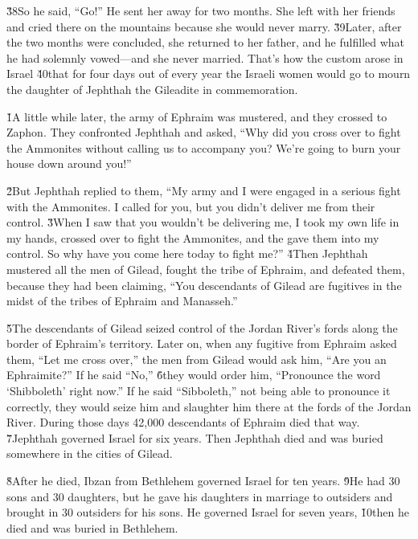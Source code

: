 \v{38}So he said, ``Go!'' He sent her away for two months. She left with her friends and cried there on the mountains because she would never marry. \v{39}Later, after the two months were concluded, she returned to her father, and he fulfilled what he had solemnly vowed---and she never married. That's how the custom arose in Israel \v{40}that for four days out of every year the Israeli women would go to mourn the daughter of Jephthah the Gileadite in commemoration.

\v{1}A little while later, the army of Ephraim was mustered, and they crossed to Zaphon. They confronted Jephthah and asked, ``Why did you cross over to fight the Ammonites without calling us to accompany you? We're going to burn your house down around you!''

\v{2}But Jephthah replied to them, ``My army and I were engaged in a serious fight with the Ammonites. I called for you, but you didn't deliver me from their control. \v{3}When I saw that you wouldn't be delivering me, I took my own life in my hands, crossed over to fight the Ammonites, and the  gave them into my control. So why have you come here today to fight me?'' \v{4}Then Jephthah mustered all the men of Gilead, fought the tribe of Ephraim, and defeated them, because they had been claiming, ``You descendants of Gilead are fugitives in the midst of the tribes of Ephraim and Manasseh.''

\v{5}The descendants of Gilead seized control of the Jordan River's fords along the border of Ephraim's territory. Later on, when any fugitive from Ephraim asked them, ``Let me cross over,'' the men from Gilead would ask him, ``Are you an Ephraimite?'' If he said ``No,'' \v{6}they would order him, ``Pronounce the word `Shibboleth' right now.'' If he said ``Sibboleth,'' not being able to pronounce it correctly, they would seize him and slaughter him there at the fords of the Jordan River. During those days 42,000 descendants of Ephraim died that way. \v{7}Jephthah governed Israel for six years. Then Jephthah died and was buried somewhere in the cities of Gilead.

\v{8}After he died, Ibzan from Bethlehem governed Israel for ten years. \v{9}He had 30 sons and 30 daughters, but he gave his daughters in marriage to outsiders and brought in 30 outsiders for his sons. He governed Israel for seven years, \v{10}then he died and was buried in Bethlehem.

